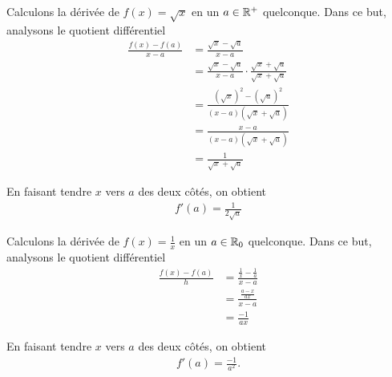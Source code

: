 \documentclass[main.tex]{subfiles}
\begin{document}
\begin{example}

    Calculons la dérivée de $f(x) = \sqrt x$ en un $a \in \mathbb{R}^+$ quelconque.
    Dans ce but,
    analysons le quotient différentiel
    \begin{align}
        \frac {f(x) - f(a)}{x - a}
        &= \frac {\sqrt x - \sqrt a}{x - a}\\
        &= \frac {\sqrt x - \sqrt a}{x - a} \cdot \frac{\sqrt x + \sqrt a}{\sqrt x + \sqrt a}\\
        &= \frac {{(\sqrt x)}^2 - {(\sqrt a)}^2}{(x - a) (\sqrt x + \sqrt a)}\\
        &= \frac {x - a} {(x - a) (\sqrt x + \sqrt a)}\\
        &= \frac 1 {\sqrt x + \sqrt a}
    \end{align}

    En faisant tendre $x$ vers $a$ des deux côtés,
    on obtient
    \begin{align}
        f'(a) = \frac 1 {2 \sqrt a}
    \end{align}
\end{example}

\begin{example}

    Calculons la dérivée de $f(x) = \frac 1 x$ en un $a \in \mathbb{R}_0$ quelconque.
    Dans ce but,
    analysons le quotient différentiel
    \begin{align}
        \frac {f(x) - f(a)} h
        &= \frac {\frac 1 x - \frac 1 a}{x - a}\\
        &= \frac{\frac{a - x}{ax}}{x - a}\\
        &= \frac {-1}{ax}
    \end{align}

    En faisant tendre $x$ vers $a$ des deux côtés,
    on obtient
    \begin{align}
        f'(a) = \frac {-1} {a^2}.
    \end{align}
\end{example}
\end{document}
